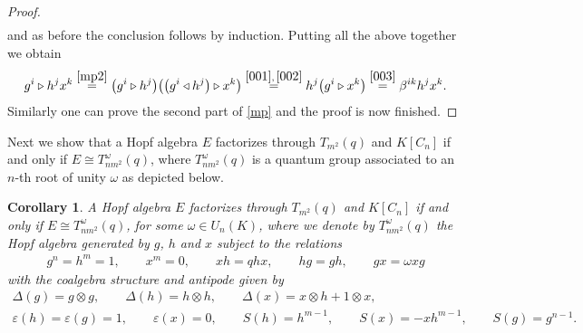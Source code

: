 \documentclass[11pt]{article}
\numberwithin{equation}{section}
\newtheorem{Corollary}[Theorem]{Corollary}
\begin{document}
\begin{proof}
\begin{gather*}
\end{gather*}
and as before the conclusion follows by induction. Putting all the above together we obtain
\begin{gather*}
g^{i} \triangleright h^{j} x^{k} \stackrel{\eqref{mp2}} {=} \big(g^{i} \triangleright h^{j}\big)\big( \big(g^{i} \triangleleft h^{j}\big)\triangleright x^{k}\big) \stackrel{\eqref{001}, \, \eqref{002}} {=} h^{j} \big(g^{i} \triangleright x^{k}\big)\stackrel{\eqref{003}} {=} \beta^{ik} h^{j} x^{k}.
\end{gather*}
Similarly one can prove the second part of \eqref{mp} and the proof is now finished.
\end{proof}

Next we show that a Hopf algebra $E$ factorizes through $T_{m^{2}}(q)$ and $K[C_n]$ if and only if $E \cong T_{nm^{2}}^{\omega}(q)$, where $T_{nm^{2}}^ {\omega}(q)$ is a quantum group associated to an $n$-th root of unity $\omega$ as depicted below.

\begin{Corollary}\label{primaclasi}
A Hopf algebra $E$ factorizes through $T_{m^{2}}(q)$ and $K[C_n]$ if and only if $E \cong T_{nm^{2}}^ {\omega}(q)$, for some $\omega \in U_n (K)$, where we denote by $T_{nm^{2}}^{\omega}(q)$ the Hopf algebra generated by $g$, $h$ and $x$ subject to the relations
\begin{gather*}
g^{n} = h^{m} = 1,\qquad x^{m} = 0,\qquad x h = q h x, \qquad h g = g h,\qquad g x = \omega x g
\end{gather*}
with the coalgebra structure and antipode given by
\begin{gather*}
\Delta(g) = g \otimes g, \qquad \Delta(h) = h \otimes h, \qquad \Delta(x) = x \otimes h + 1 \otimes x,\\
\varepsilon(h) = \varepsilon(g) = 1, \qquad \varepsilon(x) = 0, \qquad S(h) = h^{m-1}, \qquad S(x) = -xh^{m-1}, \qquad S(g) = g^{n-1}.
\end{gather*}
\end{Corollary}
\end{document}
